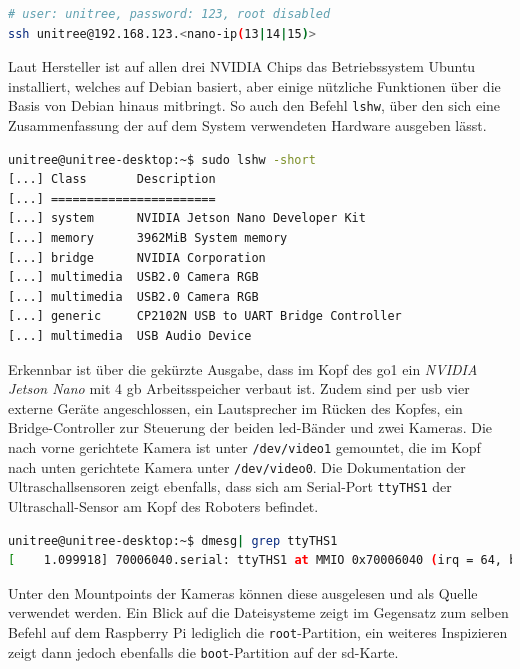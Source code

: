 \begin{lstlisting}[language=sh, label=lst:nanos-ssh]
# user: unitree, password: 123, root disabled
ssh unitree@192.168.123.<nano-ip(13|14|15)>
\end{lstlisting}

Laut Hersteller ist auf allen drei NVIDIA Chips das Betriebssystem Ubuntu installiert, welches auf Debian basiert, aber einige nützliche
Funktionen über die Basis von Debian hinaus mitbringt.
So auch den Befehl \texttt{lshw}, über den sich eine Zusammenfassung der auf dem System verwendeten Hardware ausgeben lässt.

\begin{lstlisting}[language=sh, label=lst:nanos-hardware-kopf, columns=fixed]
unitree@unitree-desktop:~$ sudo lshw -short
[...] Class       Description
[...] =======================
[...] system      NVIDIA Jetson Nano Developer Kit
[...] memory      3962MiB System memory
[...] bridge      NVIDIA Corporation
[...] multimedia  USB2.0 Camera RGB
[...] multimedia  USB2.0 Camera RGB
[...] generic     CP2102N USB to UART Bridge Controller
[...] multimedia  USB Audio Device
\end{lstlisting}

\noindent Erkennbar ist über die gekürzte Ausgabe, dass im Kopf des \gls{go1} ein \emph{NVIDIA Jetson Nano} mit \num{4} \gls{gb}
Arbeitsspeicher verbaut ist.
Zudem sind per \gls{usb} vier externe Geräte angeschlossen, ein Lautsprecher im Rücken des Kopfes, ein Bridge-Controller
zur Steuerung der beiden \gls{led}-Bänder und zwei Kameras.
Die nach vorne gerichtete Kamera ist unter \texttt{/dev/video1} gemountet, die im Kopf nach unten gerichtete Kamera unter
\texttt{/dev/video0}.
Die Dokumentation der Ultraschallsensoren zeigt ebenfalls, dass sich am Serial-Port \texttt{ttyTHS1} der Ultraschall-Sensor
am Kopf des Roboters befindet.

\begin{lstlisting}[language=sh, label=lst:nano-head-ulrtassonic]
unitree@unitree-desktop:~$ dmesg| grep ttyTHS1
[    1.099918] 70006040.serial: ttyTHS1 at MMIO 0x70006040 (irq = 64, base_baud = 0) is a TEGRA_UART
\end{lstlisting}

\noindent Unter den Mountpoints der Kameras können diese ausgelesen und als Quelle verwendet werden.
Ein Blick auf die Dateisysteme zeigt im Gegensatz zum selben Befehl auf dem Raspberry Pi lediglich die \texttt{root}-Partition,
ein weiteres Inspizieren zeigt dann jedoch ebenfalls die \texttt{boot}-Partition auf der \gls{sd}-Karte.

